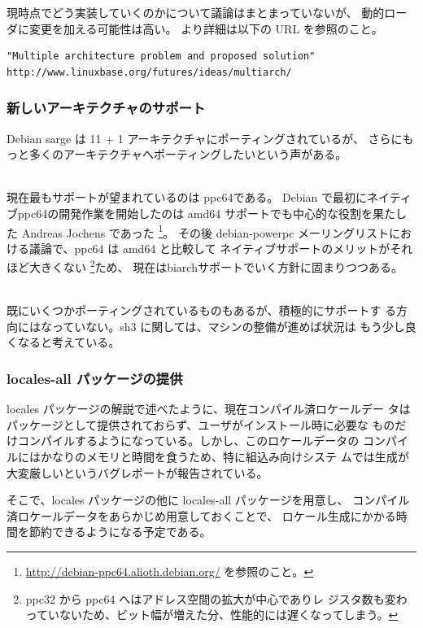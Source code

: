 \documentclass[mingoth]{jsarticle}
\newcommand{\subsubsubsection}[1]{%
\vspace{1zw}{\bf #1}\\}
\begin{document}
    現時点でどう実装していくのかについて議論はまとまっていないが、
    動的ローダに変更を加える可能性は高い。
    より詳細は以下の URL を参照のこと。

\begin{Verbatim}[frame=single]
"Multiple architecture problem and proposed solution"
http://www.linuxbase.org/futures/ideas/multiarch/
\end{Verbatim}

  \subsubsection{新しいアーキテクチャのサポート}

    Debian sarge は 11 + 1 アーキテクチャにポーティングされているが、
    さらにもっと多くのアーキテクチャへポーティングしたいという声がある。

    \subsubsubsection{ppc64}

      現在最もサポートが望まれているのは ppc64である。
      Debian で最初にネイティブppc64の開発作業を開始したのは
      amd64 サポートでも中心的な役割を果たした Andreas Jochens であった
      \footnote{\url{http://debian-ppc64.alioth.debian.org/} を参照のこと。}。
      その後 debian-powerpc メーリングリストにおける議論で、ppc64 は amd64 と比較して
      ネイティブサポートのメリットがそれほど大きくない
      \footnote{ppc32 から ppc64 へはアドレス空間の拡大が中心でありレ
      ジスタ数も変わっていないため、ビット幅が増えた分、性能的には遅くなってしまう。}ため、
	    現在はbiarchサポートでいく方針に固まりつつある。

    \subsubsubsection{sh3, m32r, mips64, parisc64}

      既にいくつかポーティングされているものもあるが、積極的にサポートす
      る方向にはなっていない。sh3 に関しては、マシンの整備が進めば状況は
      もう少し良くなると考えている。

  \subsubsection{locales-all パッケージの提供}

    locales パッケージの解説で述べたように、現在コンパイル済ロケールデー
    タはパッケージとして提供されておらず、ユーザがインストール時に必要な
    ものだけコンパイルするようになっている。しかし、このロケールデータの
    コンパイルにはかなりのメモリと時間を食うため、特に組込み向けシステ
    ムでは生成が大変厳しいというバグレポートが報告されている。

    そこで、locales パッケージの他に locales-all パッケージを用意し、
    コンパイル済ロケールデータをあらかじめ用意しておくことで、
    ロケール生成にかかる時間を節約できるようになる予定である。
\end{document}
